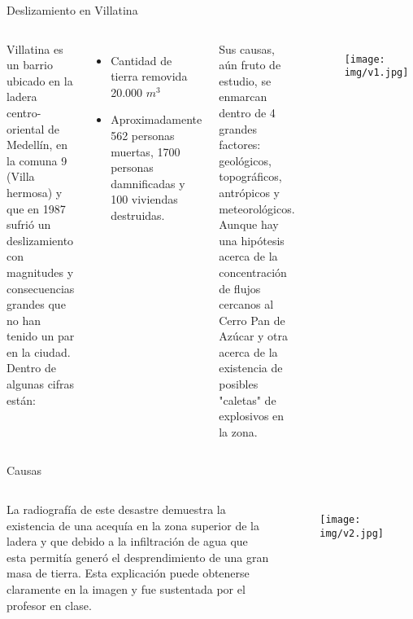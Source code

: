 \documentclass[11pt]{beamer}
\begin{document}
\begin{frame}{Deslizamiento en Villatina}

\begin{columns}[t]
	
	Villatina es un barrio ubicado en la ladera centro-oriental de Medellín, en la comuna 9 (Villa hermosa) y que en 1987 sufrió un deslizamiento con magnitudes y consecuencias grandes que no han tenido un par en la ciudad. Dentro de algunas cifras están:
	
	
	\begin{itemize}
	\item Cantidad de tierra removida 20.000 $m^{3}$
	
	\item Aproximadamente 562 personas muertas, 1700 personas damnificadas y 100 viviendas destruidas.
	
	\end{itemize}
	Sus causas, aún fruto de estudio, se enmarcan dentro de 4 grandes factores: geológicos, topográficos, antrópicos y meteorológicos. Aunque hay una hipótesis acerca de la concentración de flujos cercanos al Cerro Pan de Azúcar y otra acerca de la existencia de posibles "caletas" de explosivos en la zona.

	\begin{figure}
		\texttt{[image: img/v1.jpg]}
	\end{figure}

\end{columns}
\end{frame}

\begin{frame}{Causas}
	\begin{columns}[t]
		
		
		\justify
		La radiografía de este desastre demuestra la existencia de una acequía en la zona superior de la ladera y que debido a la infiltración de agua que esta permitía generó el desprendimiento de una gran masa de tierra. Esta explicación puede obtenerse claramente en la imagen y fue sustentada por el profesor en clase.
		
		
		\begin{figure}
			\texttt{[image: img/v2.jpg]}
		\end{figure}
\end{columns}	

\end{frame}
\end{document}
